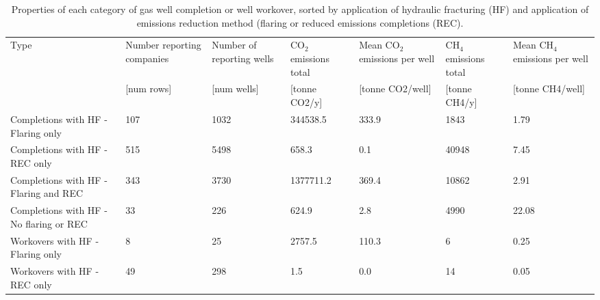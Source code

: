 \documentclass[11pt]{report}
\begin{document}
{{{{\begin{landscape}
\begin{table}
\begin{scriptsize}
\caption{Properties of each category of gas well completion or well workover, sorted by application of hydraulic fracturing (HF) and application of emissions reduction method (flaring or reduced emissions completions (REC).}
\label{tab:HF_emissions_table}
\begin{tabular*}{1\columnwidth}{p{}p{}p{}p{}p{}p{}p{}}
\toprule
Type                                                                                                   & Number reporting companies & Number of reporting wells & CO$_2$ emissions total & Mean CO$_2$ emissions per well & CH$_4$ emissions total & Mean CH$_4$ emissions per well \\
                                                                                                       & {[}num rows{]}             & {[}num wells{]}           & {[}tonne CO2/y{]}   & {[}tonne CO2/well{]}   & {[}tonne CH4/y{]}   & {[}tonne CH4/well{]}   \\
\midrule
Completions with HF - Flaring only                              & 107                        & 1032                      & 344538.5            & 333.9                  & 1843                & 1.79                   \\
Completions with HF - REC only              			 & 515                        & 5498                      & 658.3               & 0.1                    & 40948               & 7.45                   \\
Completions with HF - Flaring and REC       		 & 343                        & 3730                      & 1377711.2           & 369.4                  & 10862               & 2.91                   \\
Completions with HF - No flaring or REC 			& 33                         & 226                       & 624.9               & 2.8                    & 4990                & 22.08                  \\
Workovers with HF - Flaring only                                       & 8                          & 25                        & 2757.5              & 110.3                  & 6                   & 0.25                   \\
Workovers with HF - REC only                			& 49                         & 298                       & 1.5                 & 0.0                    & 14                  & 0.05                   \\

\end{tabular*}
\end{scriptsize}
\end{table}
\end{landscape}}}}}
\end{document}
